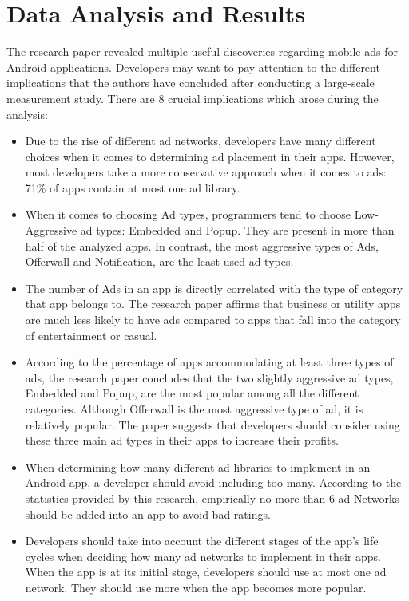 \documentclass[conference]{IEEEtran}
\begin{document}
\section{Data Analysis and Results}
\label{SectionFive}
The research paper revealed multiple useful discoveries regarding mobile ads for Android applications. Developers may want to pay attention to the different implications that the authors have concluded after conducting a large-scale measurement study. There are 8 crucial implications which arose during the analysis:
\begin{itemize}
\item Due to the rise of different ad networks, developers have many different choices when it comes to determining ad placement in their apps. However, most developers take a more conservative approach when it comes to ads: 71\% of apps contain at most one ad library.
\item When it comes to choosing Ad types, programmers tend to choose Low-Aggressive ad types: Embedded and Popup. They are present in more than half of the analyzed apps. In contrast, the most aggressive types of Ads, Offerwall and Notification, are the least used ad types.
\item The number of Ads in an app is directly correlated with the type of category that app belongs to. The research paper affirms that business or utility apps are much less likely to have ads compared to apps that fall into the category of entertainment or casual.
\item According to the percentage of apps accommodating at least three types of ads, the research paper concludes that the two slightly aggressive ad types, Embedded and Popup, are the most popular among all the different categories. Although Offerwall is the most aggressive type of ad, it is relatively popular. The paper suggests that developers should consider using these three main ad types in their apps to increase their profits.
\item When determining how many different ad libraries to implement in an Android app, a developer should avoid including too many. According to the statistics provided by this research, empirically no more than 6 ad Networks should be added into an app to avoid bad ratings.
\item Developers should take into account the different stages of the app's life cycles when deciding how many ad networks to implement in their apps. When the app is at its initial stage, developers should use at most one ad network. They should use more when the app becomes more popular.

\end{itemize}
\end{document}
